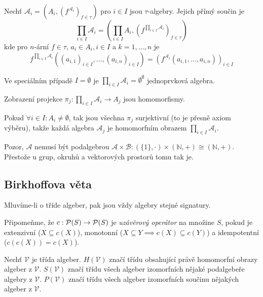 \begin{definition}
    Nechť $\mathcal{A}_i = (A_i, (f^{\mathcal{A}_i})_{f \in \tau})$ pro
    $i \in I$ jsou $\tau$-algebry. Jejich přímý součin je
    \[
        \prod_{i \in I} \mathcal{A}_i = \left(\prod_{i \in I} A_i,
        \left(f^{\prod_{i \in I} \mathcal{A}_i}\right)_{f \in \tau}\right)
    \]
    kde pro $n$-ární $f \in \tau$, $a_i \in A_i, i \in I$
    a $k = 1,\ldots,n$ je
    \[
    f^{\prod_{i \in I} \mathcal{A}_i}
    ((a_{i,1})_{i \in I}, \ldots, (a_{i,n})_{i \in I})
    = (f^{\mathcal{A}_i}(a_{i,1}, \ldots, a_{i,n}))_{i \in I}
    \]
\end{definition}

Ve speciálním případě $I = \emptyset$ je
$\prod_{i \in I} \mathcal{A}_i = \emptyset^\emptyset$ jednoprvková
algebra.

Zobrazení projekce
$\pi_j : \prod_{i \in I} \mathcal{A}_i \to A_j$ jsou homomorfismy.

Pokud $\forall i \in I : A_i \neq \emptyset$, tak jsou všechna $\pi_j$
surjektivní (to je přesně axiom výběru), takže každá algebra
$\mathcal{A}_j$ je homomorfním obrazem
$\prod_{i \in I} \mathcal{A}_i$.

Pozor, $\mathcal{A}$ nemusí být podalgebrou
$\mathcal{A} \times \mathcal{B} :
(\{1\}, \cdot) \times (\mathbb{N}, {+}) \cong (\mathbb{N}, {+})$.
Přestože u grup, okruhů a vektorových prostorů tomu tak je.

\subsection{Birkhoffova věta}

Mluvíme-li o tříde algeber, pak jsou vždy algebry stejné signatury.

Připomeňme, že $c : \mathcal{P}(S) \to \mathcal{P}(S)$
je {\em uzávěrový operátor} na množine $S$,
pokud je extenzivní ($X \subseteq c(X)$), monotonní
($X \subseteq Y \implies c(X) \subseteq c(Y)$)
a idempotentní ($c(c(X)) = c(X)$).

\begin{definition}[H, S, P]
    Nechť $\mathcal{V}$ je třída algeber.
    $H(\mathcal{V})$ značí třídu obsahující právě homomorfní obrazy
    algeber z $\mathcal{V}$.
    $S(\mathcal{V})$ značí třídu všech algeber izomorfních nějaké podalgebeře
    algebry z $\mathcal{V}$.
    $P(\mathcal{V})$ značí třídu všech algeber izomorfních součinu
    nějakých algeber z $\mathcal{V}$.
\end{definition}

